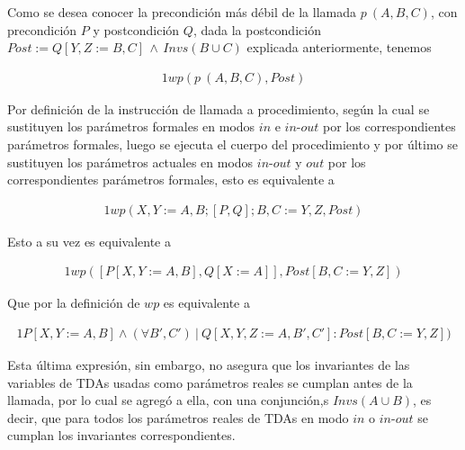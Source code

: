 Como se desea conocer la precondición más débil de la llamada $p\  (A,B,C)$, con precondición $P$ y postcondición $Q$, dada la postcondición $Post := Q[Y,Z:=B,C]\, \land \, Invs(B \cup C)$ explicada anteriormente, tenemos

\begin{alignat}{1}
wp(p\  (A,B,C), Post)
\end{alignat}

Por definición de la instrucción de llamada a procedimiento, según la cual se sustituyen los parámetros formales en modos $in$ e $in\textrm{-}out$ por los correspondientes parámetros formales, luego se ejecuta el
cuerpo del procedimiento y por último se sustituyen los parámetros
actuales en modos $in\textrm{-}out$ y $out$ por los correspondientes parámetros formales, esto es equivalente a

\begin{alignat}{1}
wp(X,Y := A,B; [P,Q]; B,C := Y,Z, Post)
\end{alignat}

Esto a su vez es equivalente a

\begin{alignat}{1}
wp([P[X,Y := A,B],Q[X:=A]], Post[B,C := Y,Z])
\end{alignat}

Que por la definición de $wp$ es equivalente a

\begin{alignat}{1}
P[X,Y := A,B] \land (\forall B', C')\ |\ Q[X,Y,Z:=A,B',C'] : Post[B,C := Y,Z])
\end{alignat}

Esta última expresión, sin embargo, no asegura que los invariantes de
las variables de TDAs usadas como parámetros reales se cumplan antes de la llamada, por lo cual se agregó a ella, con una conjunción,s $Invs(A \cup B)$, es decir, que para todos los parámetros reales de TDAs en modo 
$in$ o $in\textrm{-}out$ se cumplan los invariantes correspondientes.
